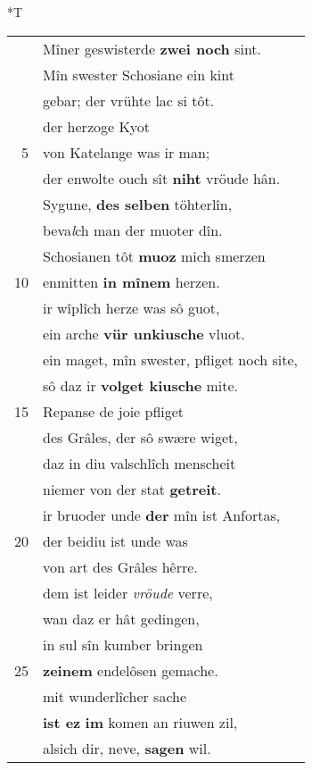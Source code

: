 \documentclass[8pt,a4paper,notitlepage]{article}
\begin{document}
\begin{table}[ht]
\begin{minipage}[t]{0.5\linewidth}
\end{minipage}
\hspace{0.5cm}
\begin{minipage}[t]{0.5\linewidth}
\small
\begin{center}*T
\end{center}
\begin{tabular}{rl}
 & Mîner geswisterde \textbf{zwei noch} sint.\\ 
 & Mîn swester Schosiane ein kint\\ 
 & gebar; der vrühte lac si tôt.\\ 
 & der herzoge Kyot\\ 
5 & von Katelange was ir man;\\ 
 & der enwolte ouch sît \textbf{niht} vröude hân.\\ 
 & Sygune, \textbf{des selben} töhterlîn,\\ 
 & beva\textit{l}ch man der muoter dîn.\\ 
 & Schosianen tôt \textbf{muoz} mich smerzen\\ 
10 & enmitten \textbf{in mînem} herzen.\\ 
 & ir wîplîch herze was sô guot,\\ 
 & ein arche \textbf{vür unkiusche} vluot.\\ 
 & ein maget, mîn swester, pfliget noch site,\\ 
 & sô daz ir \textbf{volget kiusche} mite.\\ 
15 & Repanse de joie pfliget\\ 
 & des Grâles, der sô swære wiget,\\ 
 & daz in diu valschlîch menscheit\\ 
 & niemer von der stat \textbf{getreit}.\\ 
 & ir bruoder unde \textbf{der} mîn ist Anfortas,\\ 
20 & der beidiu ist unde was\\ 
 & von art des Grâles hêrre.\\ 
 & dem ist leider \textit{vröude} verre,\\ 
 & wan daz er hât gedingen,\\ 
 & in sul sîn kumber bringen\\ 
25 & \textbf{zeinem} endelôsen gemache.\\ 
 & mit wunderlîcher sache\\ 
 & \textbf{ist ez} \textbf{im} komen an riuwen zil,\\ 
 & alsich dir, neve, \textbf{sagen} wil.\\ 

\end{tabular}
\end{minipage}
\end{table}
\end{document}
